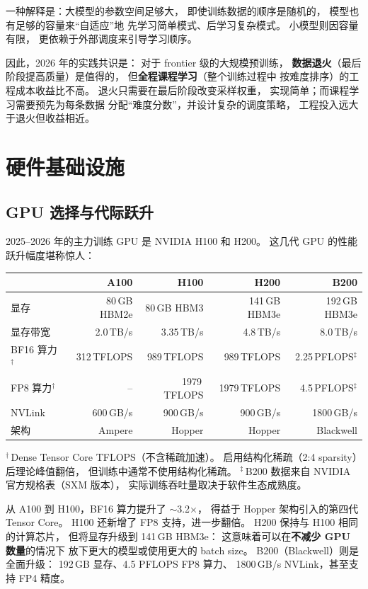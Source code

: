 一种解释是：大模型的参数空间足够大，
即使训练数据的顺序是随机的，
模型也有足够的容量来“自适应”地
先学习简单模式、后学习复杂模式。
小模型则因容量有限，
更依赖于外部调度来引导学习顺序。

因此，2026 年的实践共识是：
对于 frontier 级的大规模预训练，
\textbf{数据退火}（最后阶段提高质量）是值得的，
但\textbf{全程课程学习}（整个训练过程中
按难度排序）的工程成本收益比不高。
退火只需要在最后阶段改变采样权重，
实现简单；而课程学习需要预先为每条数据
分配“难度分数”，并设计复杂的调度策略，
工程投入远大于退火但收益相近。

\section{硬件基础设施}

\subsection{GPU 选择与代际跃升}

2025--2026 年的主力训练 GPU 是 NVIDIA H100 和 H200。
这几代 GPU 的性能跃升幅度堪称惊人：

\begin{center}\small
\renewcommand{\arraystretch}{1.3}
\begin{tabular}{lrrrr}
  \toprule
  \rowcolor{figLightGray}
  & \textbf{A100} & \textbf{H100} & \textbf{H200} & \textbf{B200} \\
  \midrule
  显存 & 80\,GB HBM2e & 80\,GB HBM3 & 141\,GB HBM3e & 192\,GB HBM3e \\
  显存带宽 & 2.0\,TB/s & 3.35\,TB/s & 4.8\,TB/s & 8.0\,TB/s \\
  BF16 算力$^\dagger$ & 312\,TFLOPS & 989\,TFLOPS & 989\,TFLOPS & 2.25\,PFLOPS$^\ddagger$ \\
  FP8 算力$^\dagger$ & -- & 1979\,TFLOPS & 1979\,TFLOPS & 4.5\,PFLOPS$^\ddagger$ \\
  NVLink & 600\,GB/s & 900\,GB/s & 900\,GB/s & 1800\,GB/s \\
  架构 & Ampere & Hopper & Hopper & Blackwell \\
  \bottomrule
\end{tabular}

\small
$^\dagger$\,Dense Tensor Core TFLOPS（不含稀疏加速）。
启用结构化稀疏（2:4 sparsity）后理论峰值翻倍，
但训练中通常不使用结构化稀疏。
$^\ddagger$\,B200 数据来自 NVIDIA 官方规格表（SXM 版本），
实际训练吞吐量取决于软件生态成熟度。
\end{center}

从 A100 到 H100，BF16 算力提升了 $\sim$3.2$\times$，
得益于 Hopper 架构引入的第四代 Tensor Core。
H100 还新增了 FP8 支持，进一步翻倍。
H200 保持与 H100 相同的计算芯片，
但将显存升级到 141\,GB HBM3e：
这意味着可以在\textbf{不减少 GPU 数量}的情况下
放下更大的模型或使用更大的 batch size。
B200（Blackwell）则是全面升级：
192\,GB 显存、4.5 PFLOPS FP8 算力、
1800\,GB/s NVLink，甚至支持 FP4 精度。

